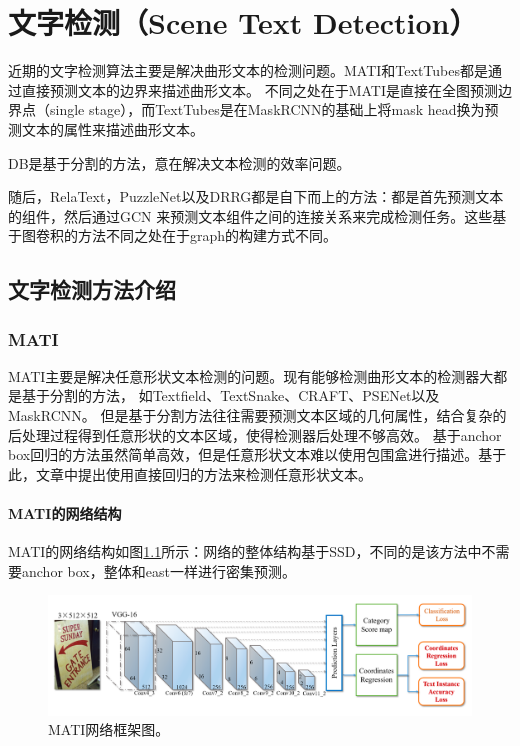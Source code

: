 \chapter{文字检测（Scene Text Detection）}
近期的文字检测算法主要是解决曲形文本的检测问题。MATI\cite{li2019learning}和TextTubes\cite{seytre2019texttubes}都是通过直接预测文本的边界来描述曲形文本。
不同之处在于MATI是直接在全图预测边界点（single stage），而TextTubes\cite{seytre2019texttubes}是在MaskRCNN的基础上将mask head换为预测文本的属性来描述曲形文本。

DB\cite{liao2019real}是基于分割的方法，意在解决文本检测的效率问题。

随后，RelaText\cite{ma2020relatext}，PuzzleNet\cite{liu2020puzzlenet}以及DRRG\cite{zhang2020deep}都是自下而上的方法：都是首先预测文本的组件，然后通过GCN
来预测文本组件之间的连接关系来完成检测任务。这些基于图卷积的方法不同之处在于graph的构建方式不同。
\section{文字检测方法介绍}
\subsection{MATI}
MATI\cite{li2019learning}主要是解决任意形状文本检测的问题。现有能够检测曲形文本的检测器大都是基于分割的方法，
如Textfield\cite{xu2019textfield}、TextSnake\cite{long2018textsnake}、CRAFT\cite{baek2019character}、PSENet\cite{wang2019shape}以及MaskRCNN\cite{he2017mask}。
但是基于分割方法往往需要预测文本区域的几何属性，结合复杂的后处理过程得到任意形状的文本区域，使得检测器后处理不够高效。
基于anchor box回归的方法虽然简单高效，但是任意形状文本难以使用包围盒进行描述。基于此，文章中提出使用直接回归的方法来检测任意形状文本。

\subsubsection{MATI的网络结构}
MATI的网络结构如图\ref{mati_framework}所示：网络的整体结构基于SSD，不同的是该方法中不需要anchor box，整体和east一样进行密集预测。
\begin{figure}[H]
    \centering
    \includegraphics[width=.98\textwidth]{figure/detection/mati_framework.png} 
    \caption{MATI网络框架图。} 
    \label{mati_framework} 
\end{figure}

